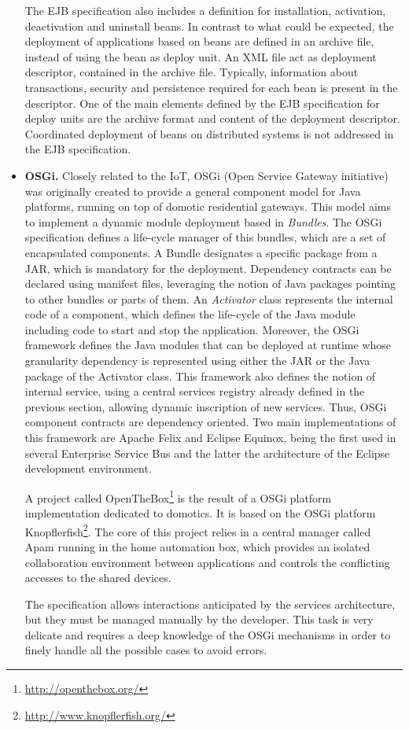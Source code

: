 \begin{itemize}
	The EJB specification also includes a definition for installation, activation, deactivation and uninstall beans.
	In contrast to what could be expected, the deployment of applications based on beans are defined in an archive file, instead of using the bean as deploy unit.
	An XML file act as deployment descriptor, contained in the archive file.
	Typically, information about transactions, security and persistence required for each bean is present in the descriptor.
	One of the main elements defined by the EJB specification for deploy units are the archive format and content of the deployment descriptor.
	Coordinated deployment of beans on distributed systems is not addressed in the EJB specification.

	\item \textbf{OSGi.} Closely related to the IoT, OSGi (Open Service Gateway initiative) was originally created to provide a general component model for Java platforms, running on top of domotic residential gateways.
	This model aims to implement a dynamic module deployment based in \textit{Bundles}.
	The OSGi specification defines a life-cycle manager of this bundles, which are a set of encapsulated components.
	A Bundle designates a specific package from a JAR, which is mandatory for the deployment.
	Dependency contracts can be declared using manifest files, leveraging the notion of Java packages pointing to other bundles or parts of them.
	An \textit{Activator} class represents the internal code of a component, which defines the life-cycle of the Java module including code to start and stop the application.
	Moreover, the OSGi framework defines the Java modules that can be deployed at runtime whose granularity dependency is represented using either the JAR or the Java package of the Activator class.
	This framework also defines the notion of internal service, using a central services registry already defined in the previous section, allowing dynamic inscription of new services.
	Thus, OSGi component contracts are dependency oriented.
	Two main implementations of this framework are Apache Felix and Eclipse Equinox, being the first used in several Enterprise Service Bus and the latter the architecture of the Eclipse development environment.
	
	A project called OpenTheBox\footnote{\url{http://openthebox.org/}} is the result of a OSGi platform implementation dedicated to domotics.
	It is based on the OSGi platform Knopflerfish\footnote{\url{http://www.knopflerfish.org/}}.
	The core of this project relies in a central manager called Apam\cite{damou2013apam} running in the home automation box, which provides an isolated collaboration environment between applications\cite{estublier2012managing} and controls the conflicting accesses to the shared devices\cite{estublier2013resource}.
	
	The specification allows interactions anticipated by the services architecture, but they must be managed manually by the developer.
	This task is very delicate and requires a deep knowledge of the OSGi mechanisms in order to finely handle all the possible cases to avoid errors.
\end{itemize}
